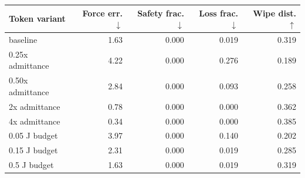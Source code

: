 \begin{tabular}{lrrrr}\toprule
Token variant & Force err. $\downarrow$ & Safety frac. $\downarrow$ & Loss frac. $\downarrow$ & Wipe dist. $\uparrow$ \\
\midrule
baseline & 1.63 & 0.000 & 0.019 & 0.319 \\
0.25x admittance & 4.22 & 0.000 & 0.276 & 0.189 \\
0.50x admittance & 2.84 & 0.000 & 0.093 & 0.258 \\
2x admittance & 0.78 & 0.000 & 0.000 & 0.362 \\
4x admittance & 0.34 & 0.000 & 0.000 & 0.385 \\
0.05 J budget & 3.97 & 0.000 & 0.140 & 0.202 \\
0.15 J budget & 2.31 & 0.000 & 0.019 & 0.285 \\
0.5 J budget & 1.63 & 0.000 & 0.019 & 0.319 \\
\bottomrule
\end{tabular}
